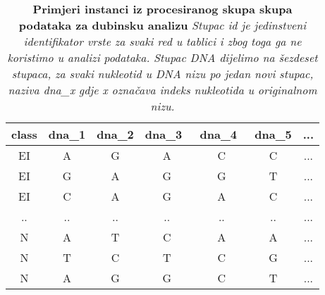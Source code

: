 \begin{table}[!ht]
   \caption[Primjeri instanci iz procesiranog skupa podataka]{
   \textbf{Primjeri instanci iz procesiranog skupa skupa podataka za dubinsku analizu} \textit{
Stupac \textit{id} je jedinstveni identifikator vrste za svaki red u tablici i zbog toga ga ne koristimo u analizi podataka. Stupac \textit{DNA} dijelimo na šezdeset stupaca, za svaki nukleotid u DNA nizu po jedan novi stupac, naziva dna\_x gdje x označava indeks nukleotida u originalnom nizu.
   }}
   \centering
   \begin{tabular}{||c | c | c |c | c | c | c ||}
   \hline
   class & dna{\_1} & dna{\_}2 & dna{\_}3\ & dna{\_}4\ & dna{\_}5 & ...\\ [0.5ex]
   \hline\hline
   EI & A & G & A & C & C & ... \\
   EI & G & A & G & G & T & ... \\
   EI & C & A & G & A & C & ... \\
   .. & .. & .. & .. & .. & .. & ... \\
   N & A  & T & C & A & A & ... \\
   N & T  & C & T & C & G & ... \\
   N & A  & G & G & C & T & ... \\ [1ex]
   \hline
   \end{tabular}
   \label{tab:datasplit}
\end{table}

